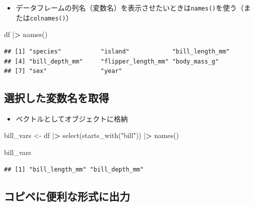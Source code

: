 \documentclass[
  xelatex,ja=standard, b5paper]{bxjsbook}
\newenvironment{Shaded}{\begin{snugshade}}{\end{snugshade}}
\newcommand{\ErrorTok}[1]{\textcolor[rgb]{0.64,0.00,0.00}{\textbf{#1}}}
\newcommand{\FunctionTok}[1]{\textcolor[rgb]{0.00,0.00,0.00}{#1}}
\newcommand{\NormalTok}[1]{#1}
\newcommand{\OtherTok}[1]{\textcolor[rgb]{0.56,0.35,0.01}{#1}}
\newcommand{\SpecialCharTok}[1]{\textcolor[rgb]{0.00,0.00,0.00}{#1}}
\newcommand{\StringTok}[1]{\textcolor[rgb]{0.31,0.60,0.02}{#1}}
\providecommand{\tightlist}{%
  \setlength{\itemsep}{0pt}\setlength{\parskip}{0pt}}
\begin{document}
\begin{itemize}
\tightlist
\item
  データフレームの列名（変数名）を表示させたいときは\texttt{names()}を使う（または\texttt{colnames()}）
\end{itemize}

\begin{Shaded}
\begin{Highlighting}[]
\NormalTok{df }\SpecialCharTok{|}\ErrorTok{\textgreater{}} \FunctionTok{names}\NormalTok{()}
\end{Highlighting}
\end{Shaded}

\begin{verbatim}
## [1] "species"           "island"            "bill_length_mm"   
## [4] "bill_depth_mm"     "flipper_length_mm" "body_mass_g"      
## [7] "sex"               "year"
\end{verbatim}

\hypertarget{select-get-obj}{%
\subsection{選択した変数名を取得}\label{select-get-obj}}

\begin{itemize}
\tightlist
\item
  ベクトルとしてオブジェクトに格納
\end{itemize}

\begin{Shaded}
\begin{Highlighting}[]
\NormalTok{bill\_vars }\OtherTok{\textless{}{-}} 
\NormalTok{  df }\SpecialCharTok{|}\ErrorTok{\textgreater{}} 
  \FunctionTok{select}\NormalTok{(}\FunctionTok{starts\_with}\NormalTok{(}\StringTok{"bill"}\NormalTok{)) }\SpecialCharTok{|}\ErrorTok{\textgreater{}} 
  \FunctionTok{names}\NormalTok{()}

\NormalTok{bill\_vars}
\end{Highlighting}
\end{Shaded}

\begin{verbatim}
## [1] "bill_length_mm" "bill_depth_mm"
\end{verbatim}

\hypertarget{select-get-out}{%
\subsection{コピペに便利な形式に出力}\label{select-get-out}}
\end{document}
